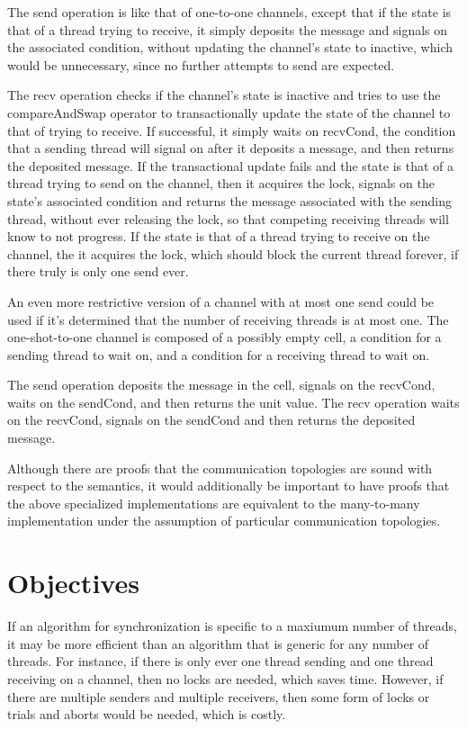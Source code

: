 \documentclass{article}
\begin{document}
The send operation is like that of one-to-one channels, except that if the state is that of a
thread trying to receive, it simply deposits the message and signals on the associated
condition, without updating the channel's state to inactive, which would be unnecessary, since
no further attempts to send are expected.

The recv operation checks if the channel's state is inactive and tries to use the
compareAndSwap operator to transactionally update the state of the channel to that of trying
to receive.  If successful, it simply waits on recvCond, the condition that a sending thread
will signal on after it deposits a message, and then returns the deposited message.  If the
transactional update fails and the state is that of a thread trying to send on the channel,
then it acquires the lock, signals on the state's associated condition and returns the message
associated with the sending thread, without ever releasing the lock, so that competing
receiving threads will know to not progress.  If the state is that of a thread trying to
receive on the channel, the it acquires the lock, which should block the current thread
forever, if there truly is only one send ever.

An even more restrictive version of a channel with at most one send could be used if it's
determined that the number of receiving threads is at most one.  The one-shot-to-one channel is
composed of a possibly empty cell, a condition for a sending thread to wait on, and a condition
for a receiving thread to wait on.

The send operation deposits the message in the cell, signals on the recvCond, waits on the
sendCond, and then returns the unit value.  The recv operation waits on the recvCond, signals
on the sendCond and then returns the deposited message.

Although there are proofs that the communication topologies are sound with respect to the
semantics, it would additionally be important to have proofs that the above specialized
implementations are equivalent to the many-to-many implementation under the assumption of
particular communication topologies.


\section{Objectives}
If an algorithm for synchronization is specific to a maxiumum number of threads, it may be more
efficient than an algorithm that is generic for any number of threads.  For instance, if there
is only ever one thread sending and one thread receiving on a channel, then no locks are
needed, which saves time.  However, if there are multiple senders and multiple receivers, then
some form of locks or trials and aborts would be needed, which is costly.
\end{document}
